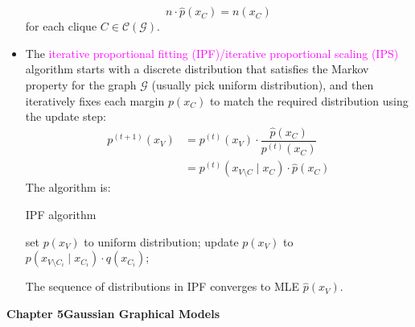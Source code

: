 \documentclass[UTF8]{book}
\newcommand{\et}{&}
\newcommand{\concept}[1]{\textcolor{magenta}{#1}}
\begin{document}
\begin{itemize}
$$
n\cdot\hat{p}(x_C) = n(x_C)
$$
for each clique $C\in \mathcal{C}(\mathcal{G})$.
\item The \concept{iterative proportional fitting (IPF)/iterative proportional scaling (IPS)} algorithm starts with a discrete distribution that satisfies the Markov property for the graph $\mathcal{G}$ (usually pick uniform distribution), and then iteratively fixes each margin $p(x_C)$ to match the required distribution using the update step:
\begin{align*}
	p^{(t+1)}(x_V) \et = p^{(t)}(x_V)\cdot\dfrac{\hat{p}(x_C)}{p^{(t)}(x_C)} \\
	\et = p^{(t)}(x_{V\setminus C}\mid x_C)\cdot\hat{p}(x_C)
\end{align*}
The algorithm is:
\begin{algorithm}
\caption{IPF algorithm}
\begin{algorithmic}
\State set $p(x_V)$ to uniform distribution;
    \State update $p(x_V)$ to $p(x_{V\setminus C_i}\mid x_{C_i})\cdot q(x_{C_i})$;
\EndFor
\EndWhile
\State {}
\EndFunction
\end{algorithmic}
\end{algorithm}
The sequence of distributions in IPF converges to MLE $\hat{p}(x_V)$.
\end{itemize}
\large{\textbf{Chapter 5\quad Gaussian Graphical Models}}
\end{document}
